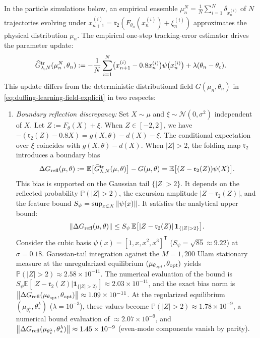 In the particle simulations below, an empirical ensemble $\mu_n^N = \frac{1}{N}\sum_{i=1}^N \delta_{x_n^{(i)}}$ of $N$ trajectories evolving under $x_{n+1}^{(i)} = \mathfrak{r}_2(F_{\theta_n}(x_n^{(i)}) + \xi_n^{(i)})$ approximates the physical distribution $\mu_n$. The empirical one-step tracking-error estimator drives the parameter update:
\begin{equation}
    \widehat G_{\lambda,N}^{\rm tr}(\mu_n^N,\theta_n)
    := -\frac{1}{N}\sum_{i=1}^N \bigl(x_{n+1}^{(i)} - 0.8 x_n^{(i)}\bigr)\psi\bigl(x_n^{(i)}\bigr)
       + \lambda(\theta_n - \theta_c).
    \label{eq:empirical-tracking-gradient}
\end{equation}
This update differs from the deterministic distributional field $G(\mu_n,\theta_n)$ in \eqref{eq:duffing-learning-field-explicit} in two respects:
\begin{enumerate}[label=(\alph*)]
   \item \emph{Boundary reflection discrepancy:} Set $X \sim \mu$ and $\xi \sim \mathcal{N}(0,\sigma^2)$ independent of $X$. Let $Z := F_\theta(X) + \xi$. When $Z \in [-2,2]$, we have $-(\mathfrak{r}_2(Z) - 0.8X) = g(X,\theta) - d(X) - \xi$. The conditional expectation over $\xi$ coincides with $g(X,\theta) - d(X)$. When $\vert Z\vert > 2$, the folding map $\mathfrak{r}_2$ introduces a boundary bias
   \[
       \Delta G_{\rm refl}(\mu,\theta)
       := \mathbb{E}\bigl[\widehat G_{\lambda,N}^{\rm tr}(\mu,\theta)\bigr] - G(\mu,\theta)
       = \mathbb{E}\bigl[(Z - \mathfrak{r}_2(Z))\psi(X)\bigr].
   \]
   This bias is supported on the Gaussian tail $\{\vert Z\vert > 2\}$. It depends on the reflected probability $\mathbb{P}(\vert Z\vert > 2)$, the excursion amplitude $\vert Z - \mathfrak{r}_2(Z)\vert$, and the feature bound $S_\psi = \sup_{x\in X}\left\lVert \psi(x)\right\rVert$. It satisfies the analytical upper bound:
   \[
       \left\lVert \Delta G_{\rm refl}(\mu,\theta)\right\rVert
       \le S_\psi\,\mathbb{E}\bigl[\vert Z - \mathfrak{r}_2(Z)\vert\,\mathbf{1}_{\{\vert Z\vert > 2\}}\bigr].
   \]
   Consider the cubic basis $\psi(x) = [1,x,x^2,x^3]^{\mathsf T}$ ($S_\psi = \sqrt{85} \approx 9.22$) at $\sigma = 0.18$. Gaussian-tail integration against the $M=1{,}200$ Ulam stationary measure at the unregularized equilibrium $(\mu_{\theta_{\rm opt}},\theta_{\rm opt})$ yields $\mathbb{P}(\vert Z\vert > 2) \approx 2.58\times 10^{-11}$. The numerical evaluation of the bound is $S_\psi\mathbb{E}[\vert Z-\mathfrak{r}_2(Z)\vert\mathbf{1}_{\{\vert Z\vert>2\}}] \approx 2.03\times 10^{-11}$, and the exact bias norm is $\left\lVert \Delta G_{\rm refl}(\mu_{\theta_{\rm opt}},\theta_{\rm opt})\right\rVert \approx 1.09\times 10^{-11}$. At the regularized equilibrium $(\mu_{\theta_*^\lambda},\theta_*^\lambda)$ ($\lambda=10^{-3}$), these values become $\mathbb{P}(\vert Z\vert > 2) \approx 1.78\times 10^{-9}$, a numerical bound evaluation of $\approx 2.07\times 10^{-9}$, and $\left\lVert \Delta G_{\rm refl}(\mu_{\theta_*^\lambda},\theta_*^\lambda)\right\rVert \approx 1.45\times 10^{-9}$ (even-mode components vanish by parity). 
   

\end{enumerate}
